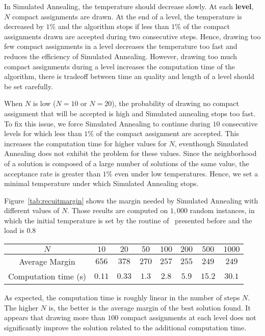  
 In Simulated Annealing, the temperature should decrease slowly. At each \textbf{level}, $N$ compact assignments are drawn. At the end of a level, the temperature is decreased by $1\%$ and the algorithm stops if less than $1\%$ of the compact assignments drawn are accepted during two consecutive steps. Hence, drawing too few compact assignments in a level decreases the temperature too fast and reduces the efficiency of Simulated Annealing. However, drawing too much compact assignments during a level increases the computation time of the algorithm, there is tradeoff between time an quality and length of a level should be set carefully.


 When $N$ is low ($N=10$ or $N = 20$), the probability of drawing no compact assignment that will be accepted is high and Simulated annealing stops too fast. To fix this issue, we force Simulated Annealing to continue during $10$ consecutive levels for which less than $1\%$ of the compact assignment are accepted. This increases the computation time for higher values for $N$, eventhough Simulated Annealing does not exhibit the problem for these values. Since the neighborhood of a solution is composed of a large number of solutions of the same value, the acceptance rate is greater than $1\%$ even under low temperatures. Hence, we set a minimal temperature under which Simulated Annealing stops.

  
Figure~\ref{tab:recuitmargin} shows the margin needed by Simulated Annealing with different values of $N$. Those results are computed on $1,000$ random instances, in which the initial temperature is set by the routine of~\cite{osman1997meta} presented before and the load is $0.8$


\begin{center}
\begin{tabular}{ |c|c|c|c|c|c|c|c| }
\hline
    $N$ & $10$& $20$& $50$ &$100$&$200$& $500$& $1000$\\
    \hline
    Average Margin & $656$& $378$& $270$ &$257$ & $255$& $249$& $249$ \\
    \hline
    Computation time (s)& $0.11$& $0.33$& $1.3$ &$2.8$ & $5.9$& $15.2$& $30.1$\\
    \hline
 \end{tabular}
\end{center}

As expected, the computation time is roughly linear in the number of steps $N$. The higher $N$ is, the better is the average margin of the best solution found. It appears that drawing more than $100$ compact assignments at each level does not significantly improve the solution related to the additional computation time. 

